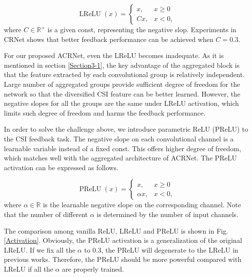 \documentclass[12pt, draftclsnofoot, onecolumn]{IEEEtran}
\DeclareMathOperator*{\LReLU}{LReLU}
\DeclareMathOperator*{\PReLU}{PReLU}
\begin{document}
\begin{equation} \label{eq-lrelu}
	\LReLU(x) = \left\{
		\begin{array}{ll}
			x, & x \ge 0 \\
			Cx, & x < 0,
		\end{array}
	\right.
\end{equation}
where $C \in \mathbb{R}^+$ is a given const, representing the negative slop. Experiments in CRNet \cite{lu2020multi} shows that better feedback performance can be achieved when $C=0.3$.

For our proposed ACRNet, even the LReLU becomes inadequate. As it is mentioned in section \ref{Section3-1}, the key advantage of the aggregated block is that the feature extracted by each convolutional group is relatively independent. Large number of aggregated groups provide sufficient degree of freedom for the network so that the diversified CSI feature can be better learned. However, the negative slopes for all the groups are the same under LReLU activation, which limits such degree of freedom and harms the feedback performance.

In order to solve the challenge above, we introduce parametric ReLU (PReLU) to the CSI feedback task. The negative slope on each convolutional channel is a learnable variable instead of a fixed const. This offers higher degree of freedom, which matches well with the aggregated architecture of ACRNet. The PReLU activation can be expressed as follows.

\begin{equation} \label{eq6}
	\PReLU(x) = \left\{
		\begin{array}{ll}
			x, & x \ge 0 \\
			\alpha x, & x < 0,
		\end{array}
	\right.
\end{equation}
where $\alpha \in \mathbb{R}$ is the learnable negative slope on the corresponding channel. Note that the number of different $\alpha$ is determined by the number of input channels.

The comparison among vanilla ReLU, LReLU and PReLU is shown in Fig. \ref{Activation}. Obviously, the PReLU activation is a generalization of the original LReLU. If we fix all the $\alpha$ to $0.3$, the PReLU will degenerate to the LReLU in previous works. Therefore, the PReLU should be more powerful compared with LReLU if all the $\alpha$ are properly trained.
\end{document}
